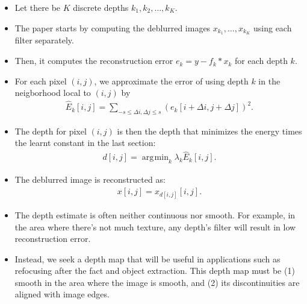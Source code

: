 \documentclass[10pt]{article}
\DeclareMathOperator*{\argmin}{\arg\!\min}
\begin{document}
\begin{itemize}
  \item Let there be $K$ discrete depths $k_1, k_2, \dots, k_K.$ 
  
  \item The paper starts by computing the deblurred images $x_{k_1}, \dotsc, x_{k_K}$ using each filter separately.
  
  \item Then, it computes the reconstruction error $e_{k} = y - f_{k} * x_{k}$ for each depth $k$.
  
  \item For each pixel $(i,j)$, we approximate the error of using depth $k$ in the neigborhood local to $(i,j)$ by
  \begin{align*}
    \hat{E}_{k}[i,j] = \sum_{-s \leq \Delta i, \Delta j \leq s} (e_k[i+\Delta i, j+\Delta j])^2.
  \end{align*}
  
  \item The depth for pixel $(i,j)$ is then the depth that minimizes the energy times the learnt constant in the last section:
  \begin{align*}
    d[i,j] = \argmin_{k} \lambda_k \hat{E}_k[i,j].
  \end{align*}
  
  \item The deblurred image is reconstructed as:
  \begin{align*}
    x[i,j] = x_{d[i,j]}[i,j].
  \end{align*}
  
  \item The depth estimate is often neither continuous nor smooth. For example, in the area where there's not much texture, any depth's filter will result in low reconstruction error.
  
  \item Instead, we seek a depth map that will be useful in applications such as refocusing after the fact and object extraction. This depth map must be (1) smooth in the area where the image is smooth, and (2) its discontinuities are aligned with image edges.
  

\end{itemize}
\end{document}

